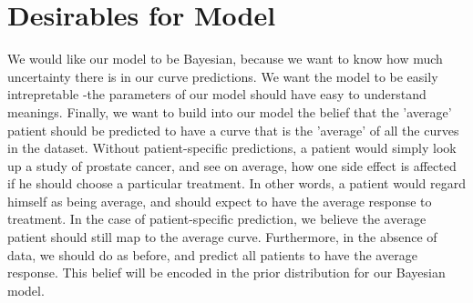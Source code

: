 \section{Desirables for Model}
We would like our model to be Bayesian, because we want to know how much uncertainty there is in our curve predictions.  We want the model to be easily intrepretable -the parameters of our model should have easy to understand meanings.  Finally, we want to build into our model the belief that the 'average' patient should be predicted to have a curve that is the 'average' of all the curves in the dataset.  Without patient-specific predictions, a patient would simply look up a study of prostate cancer, and see on average, how one side effect is affected if he should choose a particular treatment.  In other words, a patient would regard himself as being average, and should expect to have the average response to treatment.  In the case of patient-specific prediction, we believe the average patient should still map to the average curve.  Furthermore, in the absence of data, we should do as before, and predict all patients to have the average response.  This belief will be encoded in the prior distribution for our Bayesian model.